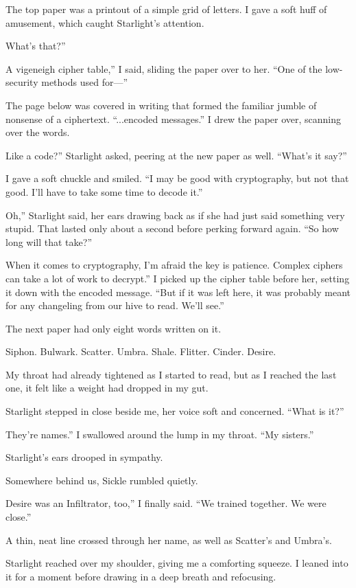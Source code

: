 The top paper was a printout of a simple grid of letters. I gave a soft huff of amusement, which caught Starlight’s attention.

\leavevmode{}What’s that?”

\leavevmode{}A vigeneigh cipher table,” I said, sliding the paper over to her. “One of the low-security methods used for—”

The page below was covered in writing that formed the familiar jumble of nonsense of a ciphertext. “...encoded messages.” I drew the paper over, scanning over the words.

\leavevmode{}Like a code?” Starlight asked, peering at the new paper as well. “What’s it say?”

I gave a soft chuckle and smiled. “I may be good with cryptography, but not that good. I’ll have to take some time to decode it.”

\leavevmode{}Oh,” Starlight said, her ears drawing back as if she had just said something very stupid. That lasted only about a second before perking forward again. “So how long will that take?”

\leavevmode{}When it comes to cryptography, I’m afraid the key is patience. Complex ciphers can take a lot of work to decrypt.” I picked up the cipher table before her, setting it down with the encoded message. “But if it was left here, it was probably meant for any changeling from our hive to read. We’ll see.”

The next paper had only eight words written on it.

Siphon. Bulwark. Scatter. Umbra. Shale. Flitter. Cinder. Desire.

My throat had already tightened as I started to read, but as I reached the last one, it felt like a weight had dropped in my gut.

Starlight stepped in close beside me, her voice soft and concerned. “What is it?”

\leavevmode{}They’re names.” I swallowed around the lump in my throat. “My sisters.”

Starlight’s ears drooped in sympathy.

Somewhere behind us, Sickle rumbled quietly.

\leavevmode{}Desire was an Infiltrator, too,” I finally said. “We trained together. We were close.”

A thin, neat line crossed through her name, as well as Scatter’s and Umbra’s.

Starlight reached over my shoulder, giving me a comforting squeeze. I leaned into it for a moment before drawing in a deep breath and refocusing.

